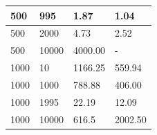 \begin{table}[h!]
\begin{tabular}{llll}
500  &     995  &     1.87  &    1.04 \\\hline
500  &     2000  &    4.73  &    2.52 \\\hline
500  &     10000  &   4000.00  & - \\ \hline
1000  &    10  &       1166.25  & 559.94 \\\hline
1000  &    1000  &    788.88  & 406.00 \\\hline
1000  &    1995  &    22.19  & 12.09 \\\hline
1000  &    10000  &   616.5  &   2002.50 \\\hline

\end{tabular}
\end{table}
